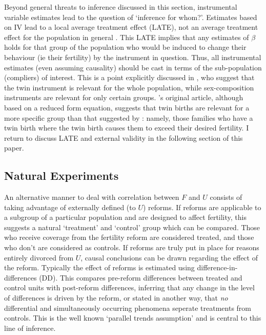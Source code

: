 Beyond general threats to inference discussed in this section, instrumental 
variable estimates lead to the question of `inference for whom?'.  Estimates 
based on IV lead to a local average treatment effect (LATE), not an average 
treatment effect for the population in general \citep{ImbensAngrist1994}.  This 
LATE implies that any estimates of $\beta$ holds for that group of the population 
who would be induced to change their behaviour (ie their fertility) by the 
instrument in question.  Thus, all instrumental estimates (even assuming causality)
should be cast in terms of the sub-population (compliers) of interest.  This is
a point explicitly discussed in \citet{Angristetal2010}, who suggest that the
twin instrument is relevant for the whole population, while sex-composition 
instruments are relevant for only certain groups. \citet{RosenzweigWolpin1980}'s 
original article, although based on a reduced form equation, suggests that twin 
births are relevant for a more specific group than that suggested by 
\citet{Angristetal2010}: namely, those families who have a twin birth where
the twin birth causes them to exceed their desired fertility.  I return to discuss 
LATE and external validity in the following section of this paper.



\subsection{Natural Experiments}
\label{Fsscn:kidNExp}
An alternative manner to deal with correlation between $F$ and $U$ consists of
taking advantage of externally defined (to $U$) reforms.  If reforms are 
applicable to a subgroup of a particular population and are designed to affect
fertility, this suggests a natural `treatment' and `control' group which can
be compared. Those who receive coverage from the fertility reform are considered 
treated, and those who don't are considered as controls.  If reforms are truly 
put in place for reasons entirely divorced from $U$, causal conclusions can be 
drawn regarding the effect of the reform.  Typically the effect of reforms is 
estimated using difference-in-differences (DD).  This compares pre-reform 
differences between treated and control units with post-reform differences, 
inferring that any change in the level of differences is driven by the reform, 
or stated in another way, that \emph{no} differential and simultaneously 
occurring phenomena seperate treatments from controls.  This is the well known 
`parallel trends assumption' and is central to this line of inference.

